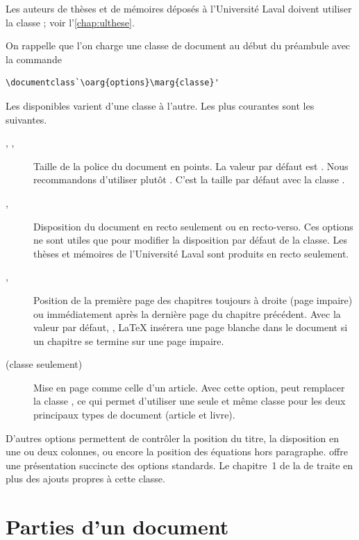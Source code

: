 Les auteurs de thèses et de mémoires déposés à l'Université Laval
doivent utiliser la classe ; voir l'\autoref{chap:ulthese}.

On rappelle que l'on charge une classe de document au début du
préambule avec la commande
\begin{lstlisting}
\documentclass`\oarg{options}\marg{classe}'
\end{lstlisting}
Les  disponibles varient d'une classe à l'autre. Les
plus courantes sont les suivantes.
\begin{description}
\item[\mdseries \code{10pt}, \code{11pt}, \code{12pt}] Taille de la
  police du document en points. La valeur par défaut est \code{10pt}.
  Nous recommandons d'utiliser plutôt \code{11pt}. C'est la taille par
  défaut avec la classe .
\item[\mdseries {}, ] Disposition du
  document en recto seulement ou en recto-verso. Ces options ne sont
  utiles que pour modifier la disposition par défaut de la classe. Les
  thèses et mémoires de l'Université Laval sont produits en recto
  seulement.
\item[\mdseries {}, ] Position de la
  première page des chapitres toujours à droite (page impaire) ou
  immédiatement après la dernière page du chapitre précédent. Avec la
  valeur par défaut, , {\LaTeX} insérera une page
  blanche dans le document si un chapitre se termine sur une page
  impaire.
\item[\mdseries {} (classe  seulement)] Mise
  en page comme celle d'un article. Avec cette option, 
  peut remplacer la classe , ce qui permet d'utiliser
  une seule et même classe pour les deux principaux types de document
  (article et livre).
\end{description}

D'autres options permettent de contrôler la position du titre, la
disposition en une ou deux colonnes, ou encore la position des
équations hors paragraphe. \citet{Thurnherr:class-options} offre une
présentation succincte des options standards. Le chapitre~1 de la %
de  traite en plus des ajouts propres à cette classe.



\section{Parties d'un document}

